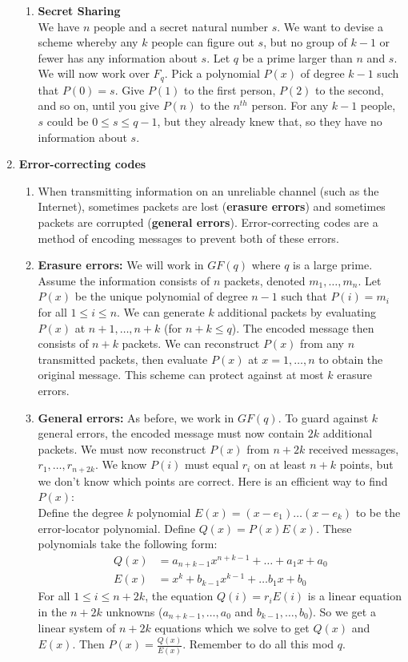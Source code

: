 \documentclass[10pt]{article}
\begin{document}
\begin{multicols}{2}
\begin{enumerate}
\begin{enumerate}
    \item \textbf{Secret Sharing} \\
    We have $n$ people and a secret natural number $s$. We want to devise a scheme whereby any $k$ people can figure out $s$, but no group of $k-1$ or fewer has any information about $s$. Let $q$ be a prime larger than $n$ and $s$. We will now work over $F_q$. Pick a polynomial $P(x)$ of degree $k-1$ such that $P(0)=s$. Give $P(1)$ to the first person, $P(2)$ to the second, and so on, until you give $P(n)$ to the $n^{th}$ person. For any $k-1$ people, $s$ could be $0 \leq s \leq q-1$, but they already knew that, so they have no information about $s$. 
    \end{enumerate}
    
    \item \textbf{Error-correcting codes}
    \begin{enumerate}
        \item When transmitting information on an unreliable channel (such as the Internet), sometimes packets are lost (\textbf{erasure errors}) and sometimes packets are corrupted (\textbf{general errors}). Error-correcting codes are a method of encoding messages to prevent both of these errors.
        \item \textbf{Erasure errors:} We will work in $GF(q)$ where $q$ is a large prime. Assume the information consists of $n$ packets, denoted $m_1,\hdots,m_n$. Let $P(x)$ be the unique polynomial of degree $n-1$ such that $P(i)=m_i$ for all $1 \leq i \leq n$. We can generate $k$ additional packets by evaluating $P(x)$ at $n+1,\hdots,n+k$ (for $n+k \leq q$). The encoded message then consists of $n+k$ packets. We can reconstruct $P(x)$ from any $n$ transmitted packets, then evaluate $P(x)$ at $x=1,\hdots,n$ to obtain the original message. This scheme can protect against at most $k$ erasure errors.
        \item \textbf{General errors:} As before, we work in $GF(q)$. To guard against $k$ general errors, the encoded message must now contain $2k$ additional packets. We must now reconstruct $P(x)$ from $n+2k$ received messages, $r_1,\hdots,r_{n+2k}$. We know $P(i)$ must equal $r_i$ on at least $n+k$ points, but we don't know which points are correct. Here is an efficient way to find $P(x)$: \\ Define the degree $k$ polynomial $E(x)=(x-e_1) \ldots (x-e_k)$ to be the error-locator polynomial. Define $Q(x)=P(x)E(x)$. These polynomials take the following form:
        \begin{align*}
            Q(x)&=a_{n+k-1}x^{n+k-1}+\hdots+a_1x+a_0 \\
            E(x)&=x^k+b_{k-1}x^{k-1}+\hdots b_1x+b_0
        \end{align*}
        For all $1 \leq i \leq n+2k$, the equation $Q(i)=r_iE(i)$ is a linear equation in the $n+2k$ unknowns ($a_{n+k-1},\hdots,a_0$ and $b_{k-1},\hdots,b_0$). So we get a linear system of $n+2k$ equations which we solve to get $Q(x)$ and $E(x)$. Then $P(x)=\frac{Q(x)}{E(x)}$. Remember to do all this mod $q$.
    \end{enumerate}
        

\end{enumerate}
\end{multicols}
\end{document}
